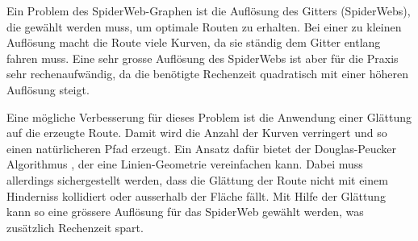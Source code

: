 Ein Problem des SpiderWeb-Graphen ist die Auflösung des Gitters (SpiderWebs), die gewählt werden muss, um optimale Routen zu erhalten. Bei einer zu kleinen Auflösung macht die Route viele Kurven, da sie ständig dem Gitter entlang fahren muss. Eine sehr grosse Auflösung des SpiderWebs ist aber für die Praxis sehr rechenaufwändig, da die benötigte Rechenzeit quadratisch mit einer höheren Auflösung steigt.

Eine mögliche Verbesserung für dieses Problem ist die Anwendung einer Glättung auf die erzeugte Route. Damit wird die Anzahl der Kurven verringert und so einen natürlicheren Pfad erzeugt. Ein Ansatz dafür bietet der Douglas-Peucker Algorithmus \cite{douglas-peucker_algorithm}, der eine Linien-Geometrie vereinfachen kann. Dabei muss allerdings sichergestellt werden, dass die Glättung der Route nicht mit einem Hinderniss kollidiert oder ausserhalb der Fläche fällt. Mit Hilfe der Glättung kann so eine grössere Auflösung für das SpiderWeb gewählt werden, was zusätzlich Rechenzeit spart.